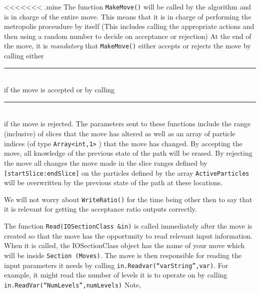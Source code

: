 \documentclass{book}
\begin{document}
<<<<<<< .mine
The function \texttt{MakeMove()} will be called by the algorithm 
and is in charge of the entire move. This means that it is in charge
of performing the metropolis proceudure by itself (This includes calling
the appropriate actions and then using a random number to decide on 
acceptance or rejection)
At the end of the move, it is {\em mandatory} that \texttt{MakeMove()} 
either accepts or
rejects the move by calling either \\
\rule{0.6cm}{0cm}\\
if the move is accepted or by calling\\
\rule{0.6cm}{0cm}\\
 if the move is rejected.  
The parameters sent to these functions
include the range (inclusive) of slices that the move has altered as
well as an array of particle indices 
(of type  \texttt{Array<int,1>} ) that the move has changed.  
By accepting the move, all knowledge of the previous state of the path
will be erased. By rejecting the move all changes the move made in the
slice ranges defined by \texttt{[startSlice:endSlice]} on the particles defined
by the array \texttt{ActiveParticles} will be overwritten by the previous state
of the path at these locations.  


We will not worry about \texttt{WriteRatio()} for the time being other then to
say that it is relevant for getting the acceptance ratio outputs
correctly.

The function \texttt{Read(IOSectionClass \&in)} is called immediately after the
move is created so that the move has the opportunity to read relevant
input information.  When it is called, the IOSectionClass object
has the name of your move which
will be inside \texttt{Section (Moves)}.
 The move is then responsible for reading the input parameters it needs
by calling \texttt{in.Readvar(``varString'',var)}. For example, it might read the 
number of levels it is to operate on by calling 
\texttt{in.ReadVar(``NumLevels'',numLevels)} Note,
\end{document}

